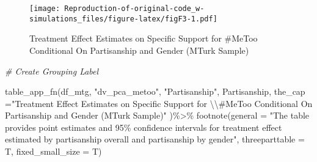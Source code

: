 \documentclass[
]{article}
\newenvironment{Shaded}{\begin{snugshade}}{\end{snugshade}}
\newcommand{\AttributeTok}[1]{\textcolor[rgb]{0.77,0.63,0.00}{#1}}
\newcommand{\CommentTok}[1]{\textcolor[rgb]{0.56,0.35,0.01}{\textit{#1}}}
\newcommand{\FunctionTok}[1]{\textcolor[rgb]{0.00,0.00,0.00}{#1}}
\newcommand{\NormalTok}[1]{#1}
\newcommand{\SpecialCharTok}[1]{\textcolor[rgb]{0.00,0.00,0.00}{#1}}
\newcommand{\StringTok}[1]{\textcolor[rgb]{0.31,0.60,0.02}{#1}}
\begin{document}
\begin{figure}
\centering
\texttt{[image: Reproduction-of-original-code\_w-simulations\_files/figure-latex/figF3-1.pdf]}
\caption{Treatment Effect Estimates on Specific Support for \#MeToo
Conditional On Partisanship and Gender (MTurk Sample)}
\end{figure}

\begin{Shaded}
\begin{Highlighting}[]
\CommentTok{\# Create Grouping Label }

\FunctionTok{table\_app\_fn}\NormalTok{(df\_mtg, }\StringTok{"dv\_pca\_metoo"}\NormalTok{,}
         \StringTok{"Partisanship"}\NormalTok{,}
\NormalTok{         Partisanship,}
         \AttributeTok{the\_cap =}\StringTok{"Treatment Effect Estimates on Specific Support for }\SpecialCharTok{\textbackslash{}\textbackslash{}}\StringTok{\#MeToo Conditional On Partisanship and Gender (MTurk Sample)"}\NormalTok{ )}\SpecialCharTok{\%\textgreater{}\%}
  \FunctionTok{footnote}\NormalTok{(}\AttributeTok{general =} \StringTok{"The table provides point estimates and 95\% confidence intervals for treatment effect estimated by partisanship overall and partisanship by gender"}\NormalTok{,}
           \AttributeTok{threeparttable =}\NormalTok{ T,}
           \AttributeTok{fixed\_small\_size =}\NormalTok{ T)}
\end{Highlighting}
\end{Shaded}
\end{document}
